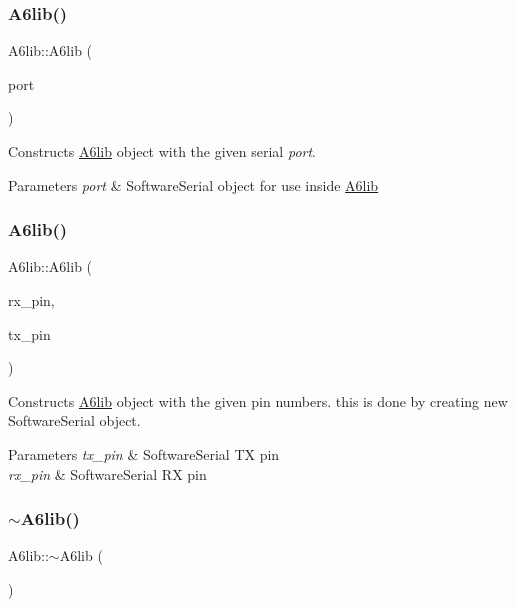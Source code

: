 \subsubsection{\texorpdfstring{A6lib()}{A6lib()}\hspace{0.1cm}{\footnotesize\ttfamily [2/3]}}
{\footnotesize\ttfamily A6lib\+::\+A6lib (\begin{DoxyParamCaption}\item[{Software\+Serial $\ast$}]{port }\end{DoxyParamCaption})}

Constructs \mbox{\hyperlink{class_a6lib}{A6lib}} object with the given serial {\itshape port}. 
\begin{DoxyParams}{Parameters}
{\em port} & Software\+Serial object for use inside \mbox{\hyperlink{class_a6lib}{A6lib}} \\
\hline
\end{DoxyParams}
\mbox{\label{class_a6lib_a318fb5617771079545af012b28f6a1e7}} 
\subsubsection{\texorpdfstring{A6lib()}{A6lib()}\hspace{0.1cm}{\footnotesize\ttfamily [3/3]}}
{\footnotesize\ttfamily A6lib\+::\+A6lib (\begin{DoxyParamCaption}\item[{uint8\+\_\+t}]{rx\+\_\+pin,  }\item[{uint8\+\_\+t}]{tx\+\_\+pin }\end{DoxyParamCaption})}

Constructs \mbox{\hyperlink{class_a6lib}{A6lib}} object with the given pin numbers. this is done by creating new Software\+Serial object. 
\begin{DoxyParams}{Parameters}
{\em tx\+\_\+pin} & Software\+Serial TX pin \\
\hline
{\em rx\+\_\+pin} & Software\+Serial RX pin \\
\hline
\end{DoxyParams}
\mbox{\label{class_a6lib_aac4fbb7021b2f1741b01d72b606d5081}} 
\subsubsection{\texorpdfstring{$\sim$\+A6lib()}{~A6lib()}}
{\footnotesize\ttfamily A6lib\+::$\sim$\+A6lib (\begin{DoxyParamCaption}{ }\end{DoxyParamCaption})}

